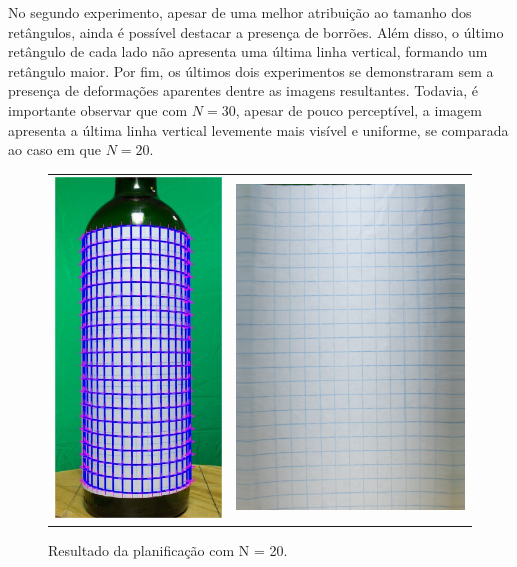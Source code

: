 No segundo experimento, apesar de uma melhor atribuição ao tamanho dos retângulos, ainda é possível destacar a presença de borrões. Além disso, o último retângulo de cada lado não apresenta uma última linha vertical, formando um retângulo maior. Por fim, os últimos dois experimentos se demonstraram sem a presença de deformações aparentes dentre as imagens resultantes. Todavia, é importante observar que com $N = 30$, apesar de pouco perceptível, a imagem apresenta a última linha vertical levemente mais visível e uniforme, se comparada ao caso em que $N = 20$.

\begin{figure}[ht]
    \caption{Resultado da planificação com N = 20.}     
    \centering
    \vspace{0.3cm}
    \begin{minipage}{.5\textwidth}
      \centering
            \begin{tabular}{cc}
            \includegraphics[width=.4\linewidth]{TCC/Imagens/ensaios/a_2020.jpg} 
            &
            \includegraphics[width=.55\linewidth]{TCC/Imagens/ensaios/b_2020.png}

\end{tabular}
\end{minipage}
\end{figure}
